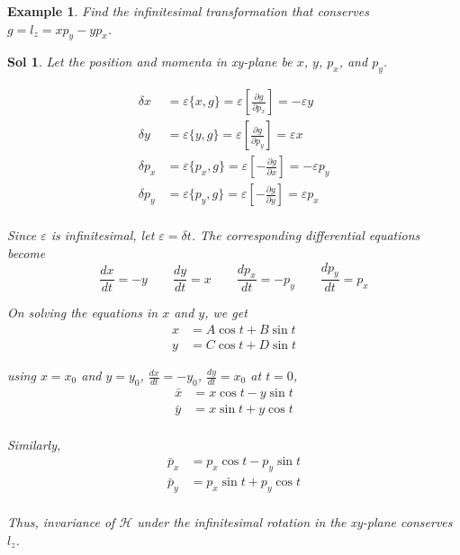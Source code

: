\documentclass[12pt,a4paper]{report}
\newcommand{\der}[2]{\frac{d#1}{d#2}}
\newcommand{\parder}[2]{\frac{\partial#1}{\partial#2}}
\newcommand{\hamiltonian}{\mathcal{H}}
\newtheorem{example}{Example}[section]
\newtheorem*{solution}{Sol}
\begin{document}
\begin{example}
    Find the infinitesimal transformation that conserves $g = l_z = xp_y - yp_x$.
\end{example}
\begin{solution}
    Let the position and momenta in xy-plane be $x$, $y$, $p_x$, and $p_y$.

    \begin{align*}
        \delta x &= \varepsilon\{x, g\} = \varepsilon\left[ \parder{g}{p_x} \right] = -\varepsilon y \\
        \delta y &= \varepsilon\{y, g\} = \varepsilon\left[ \parder{g}{p_y} \right] = \varepsilon x \\
        \delta p_x &= \varepsilon\{p_x, g\} = \varepsilon\left[- \parder{g}{x}\right] = -\varepsilon p_y \\
        \delta p_y &= \varepsilon\{p_y, g\} = \varepsilon\left[- \parder{g}{y}\right] = \varepsilon p_x \\
    \end{align*}

    Since $\varepsilon$ is infinitesimal, let $\varepsilon = \delta t$. The corresponding differential equations become
    \begin{equation*}
        \der{x}{t} = -y \qquad \der{y}{t} = x \qquad \der{p_x}{t} = -p_y \qquad \der{p_y}{t} = p_x
    \end{equation*}

    On solving the equations in $x$ and $y$, we get
    \begin{align*}
        x &= A\cos t + B\sin t \\
        y &= C\cos t + D\sin t
    \end{align*}

    using $x=x_0$ and $y=y_0$, $\der{x}{t} = -y_0$, $\der{y}{t} = x_0$ at $t=0$,
    \begin{align*}
        \bar{x} &= x\cos t - y\sin t \\
        \bar{y} &= x\sin t + y\cos t \\
    \end{align*}

    Similarly,
    \begin{align*}
        \bar{p}_x &= p_x\cos t - p_y\sin t \\
        \bar{p}_y &= p_x\sin t + p_y\cos t \\
    \end{align*}

    Thus, invariance of $\hamiltonian$ under the infinitesimal rotation in the xy-plane conserves $l_z$.
\end{solution}
\end{document}
